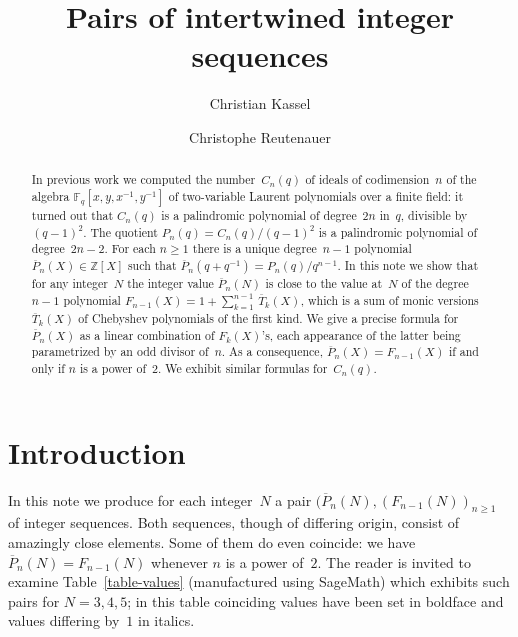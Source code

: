 \documentclass[11pt, a4paper]{amsart}
\title[Intertwined integer sequences]
{Pairs of intertwined integer sequences}
\author{Christian Kassel}
\author{Christophe Reutenauer}
\theoremstyle{definition}
\newcommand\ZZ{\mathbb{Z}}
\newcommand\FF{\mathbb{F}}
\newcommand\Pg{\overline{P}}
\newcommand\TT{\overline{T}}
\numberwithin{equation}{section}
\begin{document}
\begin{abstract}
In previous work we computed the number~$C_n(q)$ of ideals of codimension~$n$ of 
the algebra $\FF_q[x,y,x^{-1}, y^{-1}]$ of two-variable Laurent polynomials over a finite field: it turned out that 
$C_n(q)$ is a palindromic polynomial of degree~$2n$ in~$q$, divisible by~$(q-1)^2$. The quotient $P_n(q) = C_n(q)/ (q-1)^2$
is a palindromic polynomial of degree~$2n-2$. For each $n\geq 1$ there is a unique degree~$n-1$ polynomial~$\Pg_n(X) \in \ZZ[X]$
such that $\Pg_n(q+q^{-1}) = P_n(q)/q^{n-1}$. 
In this note we show that for any integer~$N$ the integer value $\Pg_n(N)$ is close to the value at~$N$ of the 
degree~$n-1$ polynomial $F_{n-1}(X) = 1 + \sum_{k=1}^{n-1} \, \TT_k(X)$,
which is a sum of monic versions $\TT_k(X)$ of Chebyshev polynomials of the first kind.
We give a precise formula for~$\Pg_n(X)$ as a linear combination of $F_k(X)$'s, each appearance of the latter being
parametrized by an odd divisor of~$n$. As a consequence, $\Pg_n(X) = F_{n-1}(X)$ if and only if $n$ is a power of~$2$.
We exhibit similar formulas for~$C_n(q)$.
\end{abstract}


\maketitle

\section{Introduction}\label{sec-intro}

In this note we produce for each integer~$N$ a pair $(\Pg_n(N), (F_{n-1}(N))_{n\geq 1}$ of integer sequences.
Both sequences, though of differing origin,
consist of amazingly close elements. Some of them do even coincide: we have $\Pg_n(N) = F_{n-1}(N)$ whenever $n$ is a power of~$2$.
The reader is invited to examine Table~\ref{table-values} (manufactured using SageMath) which exhibits such pairs for $N = 3,4,5$; 
in this table coinciding values have been set in boldface and values differing by~$1$ in italics.
\end{document}
